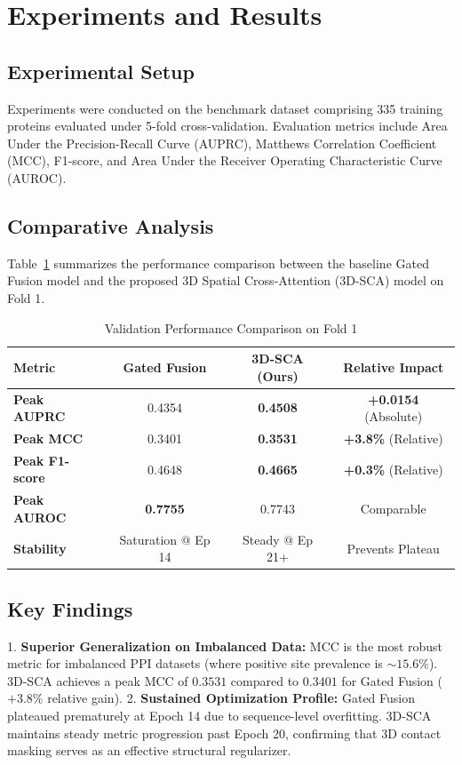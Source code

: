 \documentclass[10pt,journal,compsoc]{IEEEtran}
\begin{document}
\section{Experiments and Results}

\subsection{Experimental Setup}
Experiments were conducted on the benchmark dataset comprising 335 training proteins evaluated under 5-fold cross-validation. Evaluation metrics include Area Under the Precision-Recall Curve (AUPRC), Matthews Correlation Coefficient (MCC), F1-score, and Area Under the Receiver Operating Characteristic Curve (AUROC).

\subsection{Comparative Analysis}
Table~\ref{tab:results} summarizes the performance comparison between the baseline Gated Fusion model and the proposed 3D Spatial Cross-Attention (3D-SCA) model on Fold 1.

\begin{table}[htbp]
\caption{Validation Performance Comparison on Fold 1}
\label{tab:results}
\centering
\begin{tabular}{l c c c}
\toprule
\textbf{Metric} & \textbf{Gated Fusion} & \textbf{3D-SCA (Ours)} & \textbf{Relative Impact} \\
\midrule
\textbf{Peak AUPRC} & 0.4354 & \textbf{0.4508} & \textbf{+0.0154} (Absolute) \\
\textbf{Peak MCC} & 0.3401 & \textbf{0.3531} & \textbf{+3.8\%} (Relative) \\
\textbf{Peak F1-score} & 0.4648 & \textbf{0.4665} & \textbf{+0.3\%} (Relative) \\
\textbf{Peak AUROC} & \textbf{0.7755} & 0.7743 & Comparable \\
\textbf{Stability} & Saturation @ Ep 14 & Steady @ Ep 21+ & Prevents Plateau \\
\bottomrule
\end{tabular}
\end{table}

\subsection{Key Findings}
1. \textbf{Superior Generalization on Imbalanced Data:} MCC is the most robust metric for imbalanced PPI datasets (where positive site prevalence is $\sim 15.6\%$). 3D-SCA achieves a peak MCC of $0.3531$ compared to $0.3401$ for Gated Fusion ($+3.8\%$ relative gain).
2. \textbf{Sustained Optimization Profile:} Gated Fusion plateaued prematurely at Epoch 14 due to sequence-level overfitting. 3D-SCA maintains steady metric progression past Epoch 20, confirming that 3D contact masking serves as an effective structural regularizer.
\end{document}
